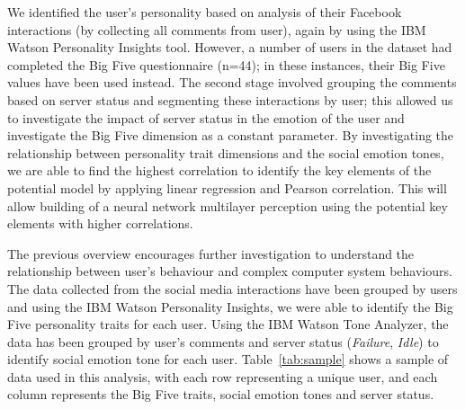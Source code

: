 \documentclass[graybox]{svmult}
\begin{document}
{We identified the user's personality based on analysis of their
Facebook interactions (by collecting all comments from user), again by
using the IBM Watson Personality Insights tool. However,
a number of users in the dataset had completed the Big Five
questionnaire (n=44); in these instances, their Big Five values have
been used instead. The second stage involved grouping the comments
based on server status and segmenting these interactions by user; this
allowed us to investigate the impact of server status in the emotion
of the user and investigate the Big Five dimension as a constant
parameter. By investigating the relationship between personality trait
dimensions and the social emotion tones, we are able to find the
highest correlation to identify the key elements of the potential
model by applying linear regression and Pearson correlation. This will
allow building of a neural network multilayer perception using the
potential key elements with higher correlations.

The previous overview encourages further investigation to understand
the relationship between user's behaviour and complex computer system
behaviours. The data collected from the social media interactions have
been grouped by users and using the IBM Watson Personality Insights,
we were able to identify the Big Five personality traits for each
user. Using the IBM Watson Tone Analyzer, the data has been grouped by
user's comments and server status ({\emph{Failure}}, {\emph{Idle}}) to
identify social emotion tone for each user. Table~\ref{tab:sample}
shows a sample of data used in this analysis, with each row
representing a unique user, and each column represents the Big Five
traits, social emotion tones and server status.

}
\end{document}
